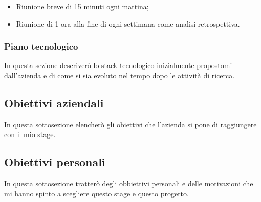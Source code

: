 \begin{itemize}
	\item Riunione breve di 15 minuti ogni mattina;
	\item Riunione di 1 ora alla fine di ogni settimana come analisi retrospettiva.
\end{itemize}  

\subsubsection{Piano tecnologico}

In questa sezione descriverò lo stack tecnologico inizialmente propostomi dall'azienda e di come si sia evoluto nel tempo dopo le attività di ricerca.

\subsection{Obiettivi aziendali}

In questa sottosezione elencherò gli obiettivi che l'azienda si pone di raggiungere con il mio stage.

\subsection{Obiettivi personali}

In questa sottosezione tratterò degli obbiettivi personali e delle motivazioni che mi hanno spinto a scegliere questo stage e questo progetto.



